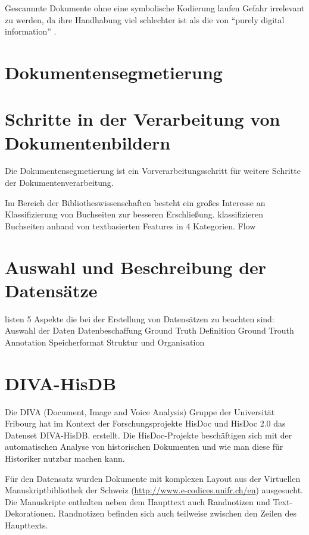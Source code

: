 Gescannnte Dokumente ohne eine symbolische Kodierung laufen Gefahr irrelevant zu werden,
da ihre Handhabung viel schlechter ist als die von ``purely digital information'' \parencite[10]{BairdDigitallibrariesdocument2003}.
 


\section{Dokumentensegmetierung}



\section{Schritte in der Verarbeitung von Dokumentenbildern}
Die Dokumentensegmetierung ist ein Vorverarbeitungsschritt für weitere Schritte der Dokumentenverarbeitung.

Im Bereich der Bibliotheswissenschaften besteht ein großes Interesse an Klassifizierung von
Buchseiten zur besseren Erschließung.
\cite{McConnaugheyLabeledSegmentationPrinted2017} klassifizieren Buchseiten anhand von textbasierten Features in 4 Kategorien. 
Flow

\section{Auswahl und Beschreibung der Datensätze}
\textcite[985\psqq]{DoermannHandbookdocumentimage2014} listen 5 Aspekte die bei der Erstellung von Datensätzen zu beachten sind:
Auswahl der Daten
Datenbeschaffung
Ground Truth Definition
Ground Trouth Annotation
Speicherformat
Struktur und Organisation

\section{DIVA-HisDB}
Die DIVA  (Document, Image and Voice Analysis) Gruppe der Universität Fribourg hat im Kontext der Forschungsprojekte HisDoc und HisDoc 2.0 
das Datenset DIVA-HisDB. erstellt.
Die HisDoc-Projekte beschäftigen sich mit der automatischen Analyse von historischen Dokumenten und
wie man diese für Historiker nutzbar machen kann.

Für den Datensatz wurden Dokumente mit komplexen Layout aus der Virtuellen Manuskriptbibliothek der Schweiz (\url{http://www.e-codices.unifr.ch/en}) ausgesucht. Die Manuskripte enthalten neben dem Haupttext auch Randnotizen und Text-Dekorationen. Randnotizen befinden sich auch teilweise zwischen den Zeilen des Haupttexts.
 
